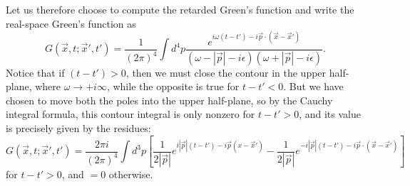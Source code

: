 Let us therefore choose to compute the retarded Green's function and write the real-space Green's function as
$$G(\vec x,t; \vec x',t')=\frac{1}{(2\pi)^4} \int d^4p \frac{e^{i\omega (t-t')-i\vec p \cdot (\vec x-\vec x')}}{(\omega-|\vec p|-i\epsilon)(\omega+|\vec p|-i\epsilon)}.$$
Notice that if $(t-t')>0$, then we must close the contour in the upper half-plane, where $\omega\to+i\infty$, while the opposite is true for $t-t'<0$. But we have chosen to move both the poles into the upper half-plane, so by the Cauchy integral formula, this contour integral is only nonzero for $t-t'>0$, and its value is precisely given by the residues:
$$G(\vec x,t;\vec x',t')=\frac{2\pi i}{(2\pi)^4} \int d^3p \left[\frac{1}{2|\vec p|}e^{i|\vec p|(t-t')-i\vec p(x-\vec x')}-\frac{1}{2|\vec p|}e^{-i|\vec p|(t-t')-i\vec p \cdot (\vec x-\vec x')}\right]$$
for $t-t'>0$, and $=0$ otherwise.

